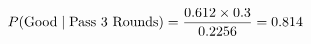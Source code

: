 \documentclass[preview]{standalone}
\begin{document}
\begin{align*}
\special{dvisvgm:raw <g id='unique000'>}P(\mathrm{Good} \mid \mathrm{Pass\ 3\ Rounds})= \dfrac{0.612 \times 0.3}{0.2256} = 0.814\special{dvisvgm:raw </g>}
\end{align*}
\end{document}
